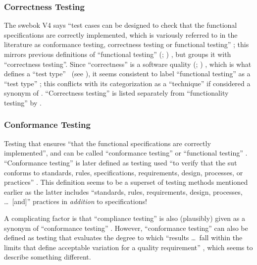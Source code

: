 \subsubsection{Correctness Testing}
\ifnotpaper \citeauthor{SWEBOK2024} \else The \acs{swebok} V4 \fi says
``test cases can be designed to check that the functional
specifications are correctly implemented, which is variously
referred to in the literature as conformance testing, correctness
testing or functional testing'' \ifnotpaper \citeyearpar[p.~5-7]{SWEBOK2024}%
\else \cite[p.~5-7]{SWEBOK2024}\fi; this mirrors previous definitions
of ``functional testing'' \ifnotpaper (\citealp[p.~21]{IEEE2022};
    \citeyear[p.~196]{IEEE2017}) \else \cite[p.~196]{IEEE2017},
    \cite[p.~21]{IEEE2022} \fi but groups it with ``correctness
testing''. Since ``correctness'' is a software quality \ifnotpaper
    (\citealp[p.~104]{IEEE2017}; \citealp[p.~3-13]{SWEBOK2024}) \else
    \cite[p.~104]{IEEE2017}, \cite[p.~3-13]{SWEBOK2024} \fi which is
what defines a ``test type'' \citep[p.~15]{IEEE2022}\ifnotpaper\
    (see )\fi,
it seems consistent to label ``functional testing'' as a ``test type''
\citep[pp.~15,~20,~22]{IEEE2022}; this conflicts with its categorization
as a ``technique'' if considered a synonym of \nameref{spec-func-test}.
``Correctness testing'' is listed separately from ``functionality testing'' by
\citet[p.~53]{Firesmith2015}.

\subsubsection{Conformance Testing}
Testing that ensures ``that the functional specifications are correctly
implemented'', and can be called ``conformance testing'' or ``functional
testing'' \citep[p.~5-7]{SWEBOK2024}.
``Conformance testing'' is later defined as testing used ``to
verify that the \acs{sut} conforms to standards, rules,
specifications, requirements, design, processes, or practices''
\citep[p.~5-7]{SWEBOK2024}. This definition seems to be a superset
of testing methods mentioned earlier as the latter includes ``standards,
rules, requirements, design, processes, \dots\ [and]'' practices in
\emph{addition} to specifications!

A complicating factor is that ``compliance testing'' is also
(plausibly) given as a synonym of ``conformance testing''
\citep[p.~43]{Kam2008}. However, ``conformance
testing'' can also be defined as testing that evaluates the degree
to which ``results \dots\ fall within the limits that define
acceptable variation for a quality requirement''
\citep[p.~93]{IEEE2017}, which seems to
describe something different.

